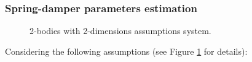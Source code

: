 \documentclass[a4paper, 11pt]{article}
\begin{document}
%


\subsubsection{Spring-damper parameters estimation}

\begin{figure}[H]
\centering
   \caption{2-bodies with 2-dimensions assumptions system.}
   \label{fig:tikz:2_bodies}
  \end{figure}

Considering the following assumptions (see Figure \ref{fig:tikz:2_bodies} for details):
\end{document}
